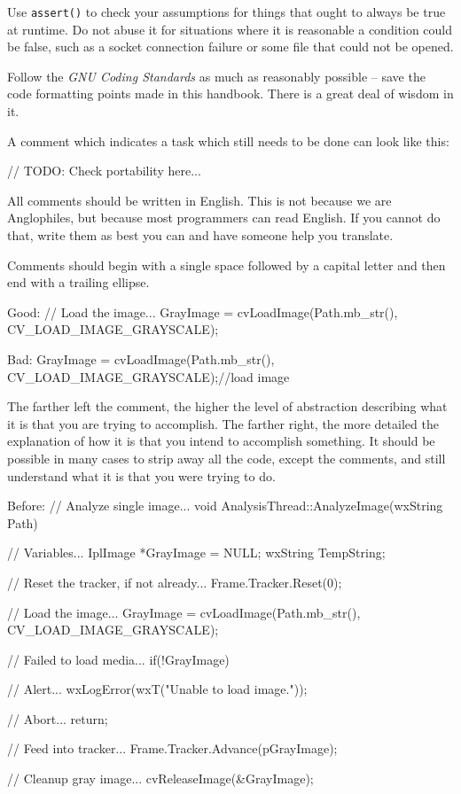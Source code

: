 \item
Use {\tt assert()} to check your assumptions for things that ought to always be true at runtime. Do not abuse it for situations where it is reasonable a condition could be false, such as a socket connection failure or some file that could not be opened.

\item
Follow the {\it GNU Coding Standards} as much as reasonably possible -- save the code formatting points made in this handbook. There is a great deal of wisdom in it.

\item
A comment which indicates a task which still needs to be done can look like this: 

\startCodeExample
// TODO: Check portability here...
\stopCodeExample

\stopitemize


\startitemize[4]
\item
All comments should be written in English. This is not because we are Anglophiles, but because most programmers can read English. If you cannot do that, write them as best you can and have someone help you translate.

\item
Comments should begin with a single space followed by a capital letter and then end with a trailing ellipse.

Good:
\startCodeExample
// Load the image...
GrayImage = cvLoadImage(Path.mb_str(), CV_LOAD_IMAGE_GRAYSCALE);
\stopCodeExample

Bad:
\startCodeExample
GrayImage = cvLoadImage(Path.mb_str(), CV_LOAD_IMAGE_GRAYSCALE);//load image
\stopCodeExample

\item
The farther left the comment, the higher the level of abstraction describing what it is that you are trying to accomplish. The farther right, the more detailed the explanation of how it is that you intend to accomplish something. It should be possible in many cases to strip away all the code, except the comments, and still understand what it is that you were trying to do.

Before:
\startCodeExample
// Analyze single image...
void AnalysisThread::AnalyzeImage(wxString Path)
{
    // Variables...
    IplImage   *GrayImage   = NULL;
    wxString    TempString;

    // Reset the tracker, if not already...
    Frame.Tracker.Reset(0);

    // Load the image...
    GrayImage = cvLoadImage(Path.mb_str(), CV_LOAD_IMAGE_GRAYSCALE);

        // Failed to load media...
        if(!GrayImage)
        {
            // Alert...
            wxLogError(wxT("Unable to load image."));
            
            // Abort...
            return;
        }

    // Feed into tracker...
    Frame.Tracker.Advance(pGrayImage);
    
    // Cleanup gray image...
    cvReleaseImage(&GrayImage);
}
\stopCodeExample

